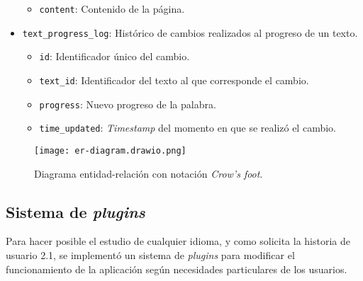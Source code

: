 \begin{itemize}
\begin{itemize}[label=$\star$]
		\item \texttt{content}: Contenido de la página.
	\end{itemize}
	\item \texttt{text\_progress\_log}: Histórico de cambios realizados al progreso de un texto.
	\begin{itemize}[label=$\star$]
		\item \texttt{id}: Identificador único del cambio.
		\item \texttt{text\_id}: Identificador del texto al que corresponde el cambio.
		\item \texttt{progress}: Nuevo progreso de la palabra.
		\item \texttt{time\_updated}: \textit{Timestamp} del momento en que se realizó el cambio.
	\end{itemize}
\end{itemize}

\begin{figure}
	\texttt{[image: er-diagram.drawio.png]}
	\caption[Diagrama entidad-relación]{Diagrama entidad-relación con notación \textit{Crow's foot}.}
\end{figure}

\subsection{Sistema de \textit{plugins}}

Para hacer posible el estudio de cualquier idioma, y como solicita la historia de usuario 2.1, se implementó un sistema de \textit{plugins} para modificar el funcionamiento de la aplicación según necesidades particulares de los usuarios.


